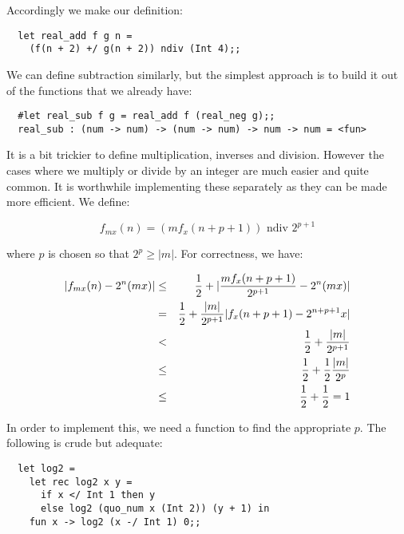 \noindent Accordingly we make our definition:

\begin{boxed}\begin{lstlisting}
  let real_add f g n =
    (f(n + 2) +/ g(n + 2)) ndiv (Int 4);;
\end{lstlisting}\end{boxed}

We can define subtraction similarly, but the simplest approach is to build it
out of the functions that we already have:

\begin{boxed}\begin{verbatim}
  #let real_sub f g = real_add f (real_neg g);;
  real_sub : (num -> num) -> (num -> num) -> num -> num = <fun>
\end{verbatim}\end{boxed}

It is a bit trickier to define multiplication, inverses and division. However
the cases where we multiply or divide by an integer are much easier and quite
common. It is worthwhile implementing these separately as they can be made more
efficient. We define:

$$ f_{m x}(n) = (m f_x(n+p+1)) \mbox{ ndiv } 2^{p+1} $$

\noindent where $p$ is chosen so that $2^p \geq |m|$. For correctness, we have:

\begin{eqnarray*}
|f_{m x}(n) - 2^n (m x)|
& \leq & {1 \over 2} + |{m f_x(n+p+1) \over 2^{p+1}} - 2^n (m x)|       \\
& =    & {1 \over 2} + {|m| \over 2^{p+1}} |f_x(n+p+1) - 2^{n+p+1} x|   \\
& <    & {1 \over 2} + {|m| \over 2^{p+1}}                              \\
& \leq & {1 \over 2} + {1 \over 2} {|m| \over 2^p}                      \\
& \leq & {1 \over 2} + {1 \over 2} = 1
\end{eqnarray*}

In order to implement this, we need a function to find the appropriate $p$. The
following is crude but adequate:

\begin{boxed}\begin{lstlisting}
  let log2 =
    let rec log2 x y =
      if x </ Int 1 then y
      else log2 (quo_num x (Int 2)) (y + 1) in
    fun x -> log2 (x -/ Int 1) 0;;
\end{lstlisting}\end{boxed}

